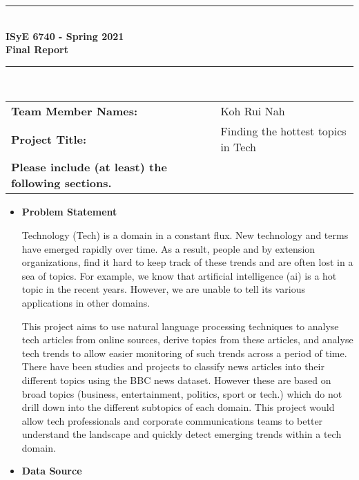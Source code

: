 \documentclass{article}
\begin{document}
\begin{titlepage}
	\clearpage\thispagestyle{empty}
	\centering
	\vspace{1cm}
		
	\rule{\linewidth}{1mm} \\[0.5cm]
	{ \Large \bfseries ISyE 6740 - Spring 2021\\[0.2cm]
		Final Report}\\[0.5cm]
	\rule{\linewidth}{1mm} \\[1cm]
	
		\begin{tabular}{l p{5cm}}
		\textbf{Team Member Names:} &  Koh Rui Nah \\[10pt]
		\textbf{Project Title:} & Finding the hottest topics in Tech \\[10pt]
		\textbf{Please include (at least) the following sections.} & \\
		\end{tabular} 

        \begin{itemize}
            \item[] \textbf{Problem Statement}
            
           \quad  Technology (Tech) is a domain in a constant flux. New technology and terms have emerged rapidly over time. As a result, people and by extension organizations, find it hard to keep track of these trends and are often lost in a sea of topics. For example, we know that artificial intelligence (ai) is a hot topic in the recent years. However, we are unable to tell its various applications in other domains.
           
            \quad This project aims to use natural language processing techniques to analyse tech articles from online sources, derive topics from these articles, and analyse tech trends to allow easier monitoring of such trends across a period of time. There have been studies and projects to classify news articles into their different topics using the BBC news dataset. However these are based on broad topics (business, entertainment, politics, sport or tech.) which do not drill down into the different subtopics of each domain. This project would allow tech professionals and corporate communications teams to better understand the landscape and quickly detect emerging trends within a tech domain.
            
            \item[] \textbf{Data Source}
            

\end{itemize}
\end{titlepage}
\end{document}

